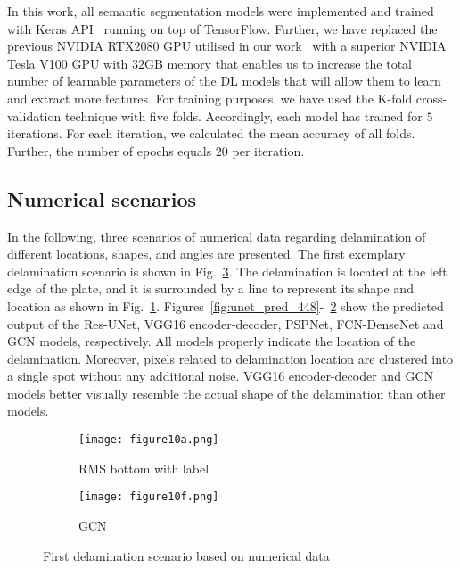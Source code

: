 \documentclass[runningheads]{llncs}
\begin{document}
In this work, all semantic segmentation models were implemented and trained with Keras API~\cite{chollet2015keras} running on top of TensorFlow.
Further, we have replaced the previous NVIDIA RTX2080 GPU utilised in our work~\cite{Ijjeh2021} with a superior NVIDIA Tesla V100 GPU with \(32\)GB memory that enables us to increase the total number of learnable parameters of the DL models that will allow them to learn and extract more features. 
For training purposes, we have used the K-fold cross-validation technique with five folds. 
Accordingly, each model has trained for \(5\) iterations. 
For each iteration, we calculated the mean accuracy of all folds.
Further, the number of epochs equals \(20\) per iteration.
\subsection{Numerical scenarios}
In the following, three scenarios of numerical data regarding delamination of different locations, shapes, and angles are presented. 
The first exemplary delamination scenario is shown in Fig.~\ref{fig:softmax_448}. 
The delamination is located at the left edge of the plate, and it is surrounded by a line to represent its shape and location as shown in Fig.~\ref{fig:RMS_flat_shell_Vz_448}.
Figures~\ref{fig:unet_pred_448}-~\ref{fig:gcn_pred_448} show the predicted output of the Res-UNet, VGG16 encoder-decoder, PSPNet, FCN-DenseNet and GCN models, respectively. 
All models properly indicate the location of the delamination. 
Moreover, pixels related to delamination location are clustered into a single spot without any additional noise. 
VGG16 encoder-decoder and GCN models better visually resemble the actual shape of the delamination than other models.
\begin{figure}[!ht]
	\centering
	\begin{subfigure}[b]{0.47\textwidth}
		\centering
		\texttt{[image: figure10a.png]}
		\caption{RMS bottom with label}
		\label{fig:RMS_flat_shell_Vz_448}
	\end{subfigure}
	\begin{subfigure}[b]{0.47\textwidth}
		\centering
		\texttt{[image: figure10f.png]}
		\caption{GCN}
		\label{fig:gcn_pred_448}
	\end{subfigure}
	\caption{First delamination scenario based on numerical data}
	\label{fig:softmax_448}
\end{figure} 
\end{document}
